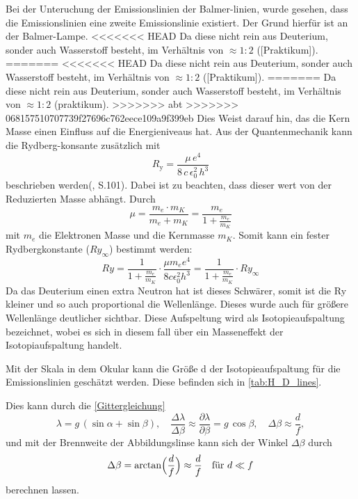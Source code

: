 Bei der Unteruchung der Emissionslinien der Balmer-linien, wurde gesehen, dass die Emissionslinien eine zweite Emissionslinie existiert.
Der Grund hierfür ist an der Balmer-Lampe. 
<<<<<<< HEAD
Da diese nicht rein aus Deuterium, sonder auch Wasserstoff besteht, im Verhältnis von $\approx 1 : 2$ ([Praktikum]). 
=======
<<<<<<< HEAD
Da diese nicht rein aus Deuterium, sonder auch Wasserstoff besteht, im Verhältnis von $\approx 1 : 2$ ([Praktikum]). 
=======
Da diese nicht rein aus Deuterium, sonder auch Wasserstoff besteht, im Verhältnis von $\approx 1 : 2$ (praktikum). 
>>>>>>> abt
>>>>>>> 068157510707739f27696c762eece109a9f399eb
Dies Weist darauf hin, das die Kern Masse einen Einfluss auf die Energieniveaus hat. 
Aus der Quantenmechanik kann die Rydberg-konsante zusätzlich mit 
\begin{equation}
  R_{\mathrm{y}} = \frac{\mu\,e^4}{8\,c\,\epsilon_0^2\,h^3}
\end{equation}
beschrieben werden(\cite{Demtröder_Ex3}, S.101). Dabei ist zu beachten, dass dieser wert von der Reduzierten Masse abhängt.
Durch 
\begin{equation}
    \mu = \frac{m_e \cdot m_K}{m_e + m_K} = \frac{m_e}{1+\frac{m_e}{m_K}}
\end{equation}
mit $m_e$ die Elektronen Masse und die Kernmasse $m_K$.
Somit kann ein fester Rydbergkonstante ($Ry_\infty$) bestimmt werden: 
\begin{equation}
    Ry = \frac{1}{1+\frac{m_e}{m_K}}\cdot \frac{\mu m_e e^4}{8c \epsilon_0^2h^3} = \frac{1}{1 + \frac{m_e}{m_K}}\cdot Ry_\infty
\end{equation}
Da das Deuterium einen extra Neutron hat ist dieses Schwärer, somit ist die Ry kleiner und so auch proportional die Wellenlänge. 
Dieses wurde auch für größere Wellenlänge deutlicher sichtbar.
Diese Aufspeltung wird als Isotopieaufspaltung bezeichnet, wobei es sich in diesem fall über ein Masseneffekt der Isotopiaufspaltung handelt.

Mit der Skala in dem Okular kann die Größe d der Isotopieaufspaltung für die Emissionslinien geschätzt werden. 
Diese befinden sich in \cref{tab:H_D_lines}.

Dies kann durch die \cref{Gittergleichung}
\begin{equation}
  \lambda = g\,(\sin\alpha + \sin\beta),
  \quad
\frac{\Delta\lambda}{\Delta\beta} \approx 
  \frac{\partial\lambda}{\partial\beta} = g\,\cos\beta,
  \label{deltalambda}
  \quad
  \Delta\beta \approx \frac{d}{f},
\end{equation}
und mit der Brennweite der Abbildungslinse kann sich der Winkel $\Delta\beta$ durch 
\begin{equation}
    \Delta\beta = \arctan\Bigl(\frac{d}{f}\Bigr) \approx \frac{d}{f} \quad \text{für } d \ll f
\end{equation}
berechnen lassen.

